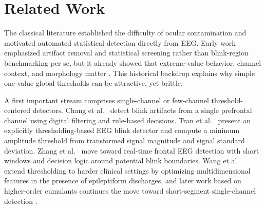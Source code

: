 
\section{Related Work}


The classical literature established the difficulty of ocular contamination and motivated automated statistical detection directly from EEG. Early work emphasized artifact removal and statistical screening rather than blink-region benchmarking per se, but it already showed that extreme-value behavior, channel context, and morphology matter \citep{croft2000removal,klein2013reliable}. This historical backdrop explains why simple one-value global thresholds can be attractive, yet brittle.

A first important stream comprises single-channel or few-channel threshold-centered detectors. Chang et al.~\citep{chang2016detection} detect blink artifacts from a single prefrontal channel using digital filtering and rule-based decisions. Tran et al.~\citep{tran2021detection} present an explicitly thresholding-based EEG blink detector and compute a minimum amplitude threshold from transformed signal magnitude and signal standard deviation. Zhang et al.~\citep{zhang2023method} move toward real-time frontal EEG detection with short windows and decision logic around potential blink boundaries. Wang et al.~\citep{wang2022multidimensional} extend thresholding to harder clinical settings by optimizing multidimensional features in the presence of epileptiform discharges, and later work based on higher-order cumulants continues the move toward short-segment single-channel detection \citep{wang2025sliding}.

